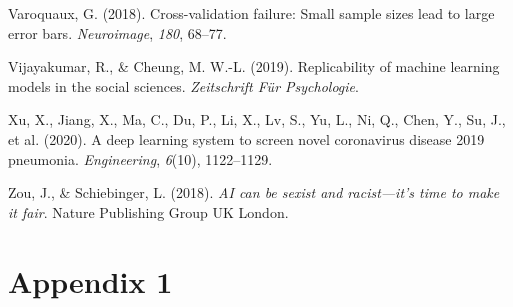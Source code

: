 \documentclass[
  man]{apa7}
\newlength{\cslhangindent}
\newlength{\cslentryspacingunit} %
\newenvironment{CSLReferences}[2] %
 {%
  \setlength{\parindent}{0pt}
  \ifodd #1
  \let\oldpar\par
  \def\par{\hangindent=\cslhangindent\oldpar}
  \fi
  \setlength{\parskip}{#2\cslentryspacingunit}
 }%
 {}
\begin{document}
\begin{CSLReferences}{1}{0}
\leavevmode{}%
Varoquaux, G. (2018). Cross-validation failure: Small sample sizes lead to large error bars. \emph{Neuroimage}, \emph{180}, 68--77.

\leavevmode{}%
Vijayakumar, R., \& Cheung, M. W.-L. (2019). Replicability of machine learning models in the social sciences. \emph{Zeitschrift F{ü}r Psychologie}.

\leavevmode{}%
Xu, X., Jiang, X., Ma, C., Du, P., Li, X., Lv, S., Yu, L., Ni, Q., Chen, Y., Su, J., et al. (2020). A deep learning system to screen novel coronavirus disease 2019 pneumonia. \emph{Engineering}, \emph{6}(10), 1122--1129.

\leavevmode{}%
Zou, J., \& Schiebinger, L. (2018). \emph{AI can be sexist and racist---it's time to make it fair}. Nature Publishing Group UK London.

\end{CSLReferences}

\endgroup

\newpage

\hypertarget{appendix-1}{%
\section{Appendix 1}\label{appendix-1}}
\end{document}
